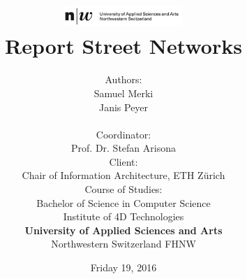 \documentclass[11pt, a4paper]{report}
\begin{document}
\title{
    \includegraphics[width=1.75in]{fhnw_fhnw_logo_en.png} \\
    \vspace*{1in}
    \textbf{Report Street Networks}}
\author{
    Authors: \\
    Samuel Merki\\
    Janis Peyer\\
    \vspace*{0.4in} \\
    Coordinator: \\
    Prof. Dr. Stefan Arisona
    \vspace*{0.4in} \\
    Client: \\
    Chair of Information Architecture,
    ETH Zürich
    \vspace*{0.4in} \\
    Course of Studies: \\ Bachelor of Science in Computer Science
    \vspace*{0.4in} \\
    Institute of 4D Technologies \\
    \textbf{University of Applied Sciences and Arts  }\\
    Northwestern Switzerland FHNW
} \date{Friday 19, 2016}
\maketitle
\setcounter{page}{1}

\tableofcontents





\pagebreak


\pagebreak


\pagebreak






\pagebreak


\pagebreak


\pagebreak


\pagebreak



\appendix
\printnoidxglossaries
\end{document}
